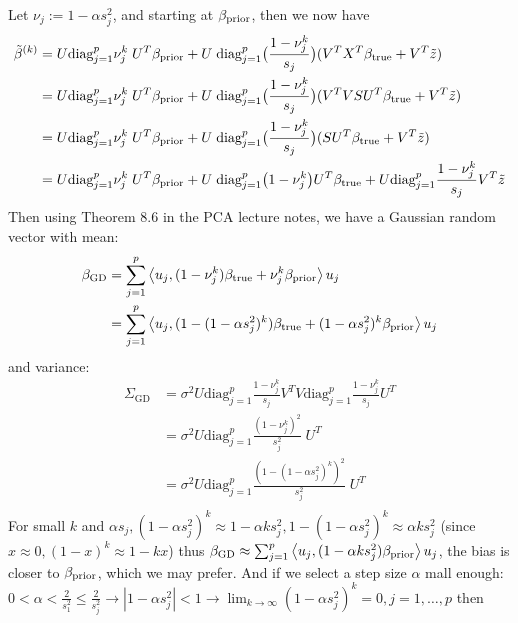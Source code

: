 \documentclass[12pt,twoside]{article}
\begin{document}
\begin{enumerate}
\begin{enumerate}
Let $\nu_j := 1 - \alpha s_j^2$, and starting at $ \beta_{\operatorname{prior}}$, then we now have
\begin{align*}
	\tilde{ \beta }^{(k)} 	&= 	  U \text{diag}_{j=1}^p   \nu_j^k \; U^T   \beta_{\operatorname{prior}} + U \;    \text{diag}_{j=1}^p \big(  \frac{ 1 - \nu_j^k} {s_j}  \big) (V^T X^T  \beta_{\operatorname{true}}  + V^T  \tilde{ z })\\
					&= 	  U \text{diag}_{j=1}^p   \nu_j^k \; U^T   \beta_{\operatorname{prior}} + U \;    \text{diag}_{j=1}^p \big(  \frac{ 1 - \nu_j^k} {s_j}  \big) (V^T V S U^T \beta_{\operatorname{true}}  + V^T  \tilde{ z })\\
					&= 	  U \text{diag}_{j=1}^p   \nu_j^k \; U^T   \beta_{\operatorname{prior}} + U \;    \text{diag}_{j=1}^p \big(  \frac{ 1 - \nu_j^k} {s_j}  \big) (S U^T \beta_{\operatorname{true}}  + V^T  \tilde{ z })\\
					&= 	  U \text{diag}_{j=1}^p   \nu_j^k \; U^T   \beta_{\operatorname{prior}} + U \;      \text{diag}_{j=1}^p \big( 1 - \nu_j^k \big)  U^T \beta_{\operatorname{true}} + U  \text{diag}_{j=1}^p \frac{ 1 - \nu_j^k} {s_j}  V^T  \tilde{ z }
\end{align*}	
 Then using Theorem 8.6 in the PCA lecture notes, we have a Gaussian random vector  with mean:
\begin{align*}
	\beta_{\text{GD}} 		&= \sum_{j=1}^p \left \langle u_j, (1 - \nu_j^k)  \beta_{\operatorname{true}} + \nu_j^k \beta_{\operatorname{prior}} \right \rangle u_j \\
						&= \sum_{j=1}^p \left \langle u_j, (1 - (1 - \alpha s_j^2)^k) \beta_{\operatorname{true}} + (1 - \alpha s_j^2)^k \beta_{\operatorname{prior}} \right \rangle u_j \\
\end{align*}
and variance:
\begin{align*} 
	\Sigma_{\text{GD}}			&= \sigma^2 U  \text{diag}_{j=1}^p \frac{1 - \nu_j^k} {s_j}  V^T V  \text{diag}_{j=1}^p \frac{ 1 - \nu_j^k} {s_j}  U^T \\
							&= \sigma^2 U   \text{diag}_{j=1}^p \frac{(1 - \nu_j^k)^2} {s_j^2} \; U^T \\
							&= \sigma^2 U   \text{diag}_{j=1}^p \frac{ (1 - (1 - \alpha s_j^2)^k)^2}  {s_j^2} \; U^T \\
\end{align*}
For small $k$ and $\alpha s_j, (1 - \alpha s_j^2)^k \approx 1 - \alpha k s_j^2, 1 - (1 - \alpha s_j^2)^k \approx  \alpha k s_j^2$ (since $x \approx 0, (1-x)^k \approx 1 -k x$)
thus $\beta_{\text{GD}} \approx  \sum_{j=1}^p \left \langle u_j, (1 - \alpha k s_j^2) \beta_{\operatorname{prior}}\right \rangle u_j$, the bias is closer to $\beta_{\operatorname{prior}}$, which we may prefer.
And if we select a step size $\alpha$ mall enough: $0 < \alpha < \frac{2} {s_1^2} \le \frac{2} {s_j^2} \rightarrow |1 - \alpha s_j^2| < 1 \rightarrow \lim_{k \rightarrow \infty} (1 - \alpha s_j^2)^k =0, j=1, \dots ,p $ then

\end{enumerate}
\end{enumerate}
\end{document}
